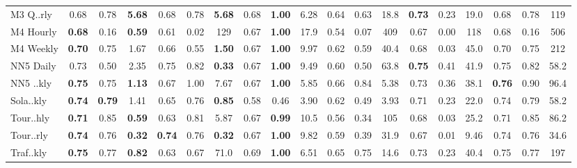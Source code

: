 \begin{tabular}{l|ccc|ccc|ccc|ccc|ccc||ccc}
        M3 Q..rly & 0.68 & 0.78 & \textbf{5.68} & 0.68 & 0.78 & \textbf{5.68} & 0.68 & \textbf{1.00} & 6.28 & 0.64 & 0.63 & 18.8 & \textbf{0.73} & 0.23 & 19.0 & 0.68 & 0.78 & 119 \\
        M4 Hourly & \textbf{0.68} & 0.16 & \textbf{0.59} & 0.61 & 0.02 & 129 & 0.67 & \textbf{1.00} & 17.9 & 0.54 & 0.07 & 409 & 0.67 & 0.00 & 118 & 0.68 & 0.16 & 506 \\
        M4 Weekly & \textbf{0.70} & 0.75 & 1.67 & 0.66 & 0.55 & \textbf{1.50} & 0.67 & \textbf{1.00} & 9.97 & 0.62 & 0.59 & 40.4 & 0.68 & 0.03 & 45.0 & 0.70 & 0.75 & 212 \\
        NN5 Daily & 0.73 & 0.50 & 2.35 & 0.75 & 0.82 & \textbf{0.33} & 0.67 & \textbf{1.00} & 9.49 & 0.60 & 0.50 & 63.8 & \textbf{0.75} & 0.41 & 41.9 & 0.75 & 0.82 & 58.2 \\
        NN5 ..kly & \textbf{0.75} & 0.75 & \textbf{1.13} & 0.67 & 1.00 & 7.67 & 0.67 & \textbf{1.00} & 5.85 & 0.66 & 0.84 & 5.38 & 0.73 & 0.36 & 38.1 & \textbf{0.76} & 0.90 & 96.4 \\
        Sola..kly & \textbf{0.74} & \textbf{0.79} & 1.41 & 0.65 & 0.76 & \textbf{0.85} & 0.58 & 0.46 & 3.90 & 0.62 & 0.49 & 3.93 & 0.71 & 0.23 & 22.0 & 0.74 & 0.79 & 58.2 \\
        Tour..hly & \textbf{0.71} & 0.85 & \textbf{0.59} & 0.63 & 0.81 & 5.87 & 0.67 & \textbf{0.99} & 10.5 & 0.56 & 0.34 & 105 & 0.68 & 0.03 & 25.2 & 0.71 & 0.85 & 86.2 \\
        Tour..rly & \textbf{0.74} & 0.76 & \textbf{0.32} & \textbf{0.74} & 0.76 & \textbf{0.32} & 0.67 & \textbf{1.00} & 9.82 & 0.59 & 0.39 & 31.9 & 0.67 & 0.01 & 9.46 & 0.74 & 0.76 & 34.6 \\
        Traf..kly & \textbf{0.75} & 0.77 & \textbf{0.82} & 0.63 & 0.67 & 71.0 & 0.69 & \textbf{1.00} & 6.51 & 0.65 & 0.75 & 14.6 & 0.73 & 0.23 & 40.4 & 0.75 & 0.77 & 197 \\
        \bottomrule
    \end{tabular}
